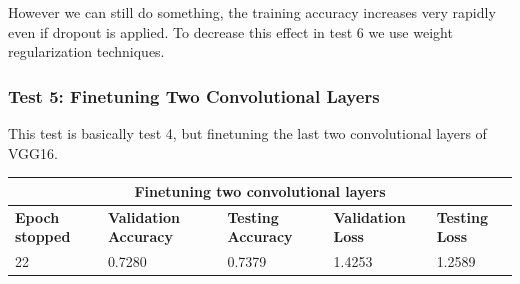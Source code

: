 However we can still do something, the training accuracy increases very rapidly even if dropout is applied. To decrease this effect in test 6 we use weight regularization techniques.



\subsubsection{Test 5: Finetuning Two Convolutional Layers}
This test is basically test 4, but finetuning the last two convolutional layers of VGG16.

 \medskip

\begin{tabular}{ |p{2cm}|p{2cm}|p{2cm}|p{2cm}|p{2cm}|  }
\hline
\multicolumn{5}{|c|}{Finetuning two convolutional layers} \\
\hline
\textbf{Epoch stopped} & \textbf{Validation Accuracy} & \textbf{Testing Accuracy} & \textbf{Validation Loss} & \textbf{Testing Loss} \\
\hline
22 & 0.7280 & 0.7379 & 1.4253 & 1.2589\\
\hline
\end{tabular}

\medskip

